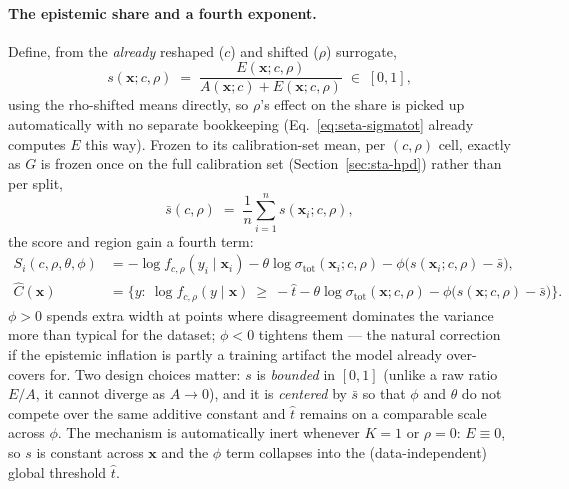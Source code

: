 \documentclass[11pt]{article}
\begin{document}
\paragraph{The epistemic share and a fourth exponent.} Define, from the \emph{already} reshaped
($c$) and shifted ($\rho$) surrogate,
\begin{equation}
s(\bm x;c,\rho) \;=\; \frac{E(\bm x;c,\rho)}{A(\bm x;c)+E(\bm x;c,\rho)} \;\in\; [0,1],
\label{eq:ease-share}
\end{equation}
using the rho-shifted means directly, so $\rho$'s effect on the share is picked up automatically
with no separate bookkeeping (Eq.~\eqref{eq:seta-sigmatot} already computes $E$ this way). Frozen
to its calibration-set mean, per $(c,\rho)$ cell, exactly as $G$ is frozen once on the full
calibration set (Section~\ref{sec:sta-hpd}) rather than per split,
\begin{equation}
\bar s(c,\rho) \;=\; \frac{1}{n}\sum_{i=1}^n s(\bm x_i;c,\rho),
\label{eq:ease-sbar}
\end{equation}
the score and region gain a fourth term:
\begin{align}
S_i(c,\rho,\theta,\phi) &= -\log f_{c,\rho}(y_i\mid\bm x_i) - \theta\log\sigma_{\mathrm{tot}}(\bm
x_i;c,\rho) - \phi\big(s(\bm x_i;c,\rho)-\bar s\big), \label{eq:ease-score}\\
\hat C(\bm x) &= \Big\{y:\ \log f_{c,\rho}(y\mid\bm x)\ \ge\ -\hat t -
\theta\log\sigma_{\mathrm{tot}}(\bm x;c,\rho) - \phi\big(s(\bm x;c,\rho)-\bar s\big)\Big\}.
\label{eq:ease-region}
\end{align}
$\phi>0$ spends extra width at points where disagreement dominates the variance more than typical
for the dataset; $\phi<0$ tightens them --- the natural correction if the epistemic inflation is
partly a training artifact the model already over-covers for. Two design choices matter: $s$ is
\emph{bounded} in $[0,1]$ (unlike a raw ratio $E/A$, it cannot diverge as $A\to0$), and it is
\emph{centered} by $\bar s$ so that $\phi$ and $\theta$ do not compete over the same additive
constant and $\hat t$ remains on a comparable scale across $\phi$. The mechanism is automatically
inert whenever $K=1$ or $\rho=0$: $E\equiv0$, so $s$ is constant across $\bm x$ and the $\phi$
term collapses into the (data-independent) global threshold $\hat t$.
\end{document}
